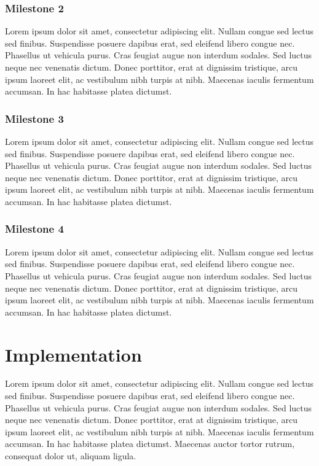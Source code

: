 \documentclass{utitcphd_overleaf}
\begin{document}
\subsection{Milestone 2}

Lorem ipsum dolor sit amet, consectetur adipiscing elit. Nullam congue sed lectus sed finibus. Suspendisse posuere dapibus erat, sed eleifend libero congue nec. Phasellus ut vehicula purus. Cras feugiat augue non interdum sodales. Sed luctus neque nec venenatis dictum. Donec porttitor, erat at dignissim tristique, arcu ipsum laoreet elit, ac vestibulum nibh turpis at nibh. Maecenas iaculis fermentum accumsan. In hac habitasse platea dictumst.

\subsection{Milestone 3}

Lorem ipsum dolor sit amet, consectetur adipiscing elit. Nullam congue sed lectus sed finibus. Suspendisse posuere dapibus erat, sed eleifend libero congue nec. Phasellus ut vehicula purus. Cras feugiat augue non interdum sodales. Sed luctus neque nec venenatis dictum. Donec porttitor, erat at dignissim tristique, arcu ipsum laoreet elit, ac vestibulum nibh turpis at nibh. Maecenas iaculis fermentum accumsan. In hac habitasse platea dictumst.

\subsection{Milestone 4}

Lorem ipsum dolor sit amet, consectetur adipiscing elit. Nullam congue sed lectus sed finibus. Suspendisse posuere dapibus erat, sed eleifend libero congue nec. Phasellus ut vehicula purus. Cras feugiat augue non interdum sodales. Sed luctus neque nec venenatis dictum. Donec porttitor, erat at dignissim tristique, arcu ipsum laoreet elit, ac vestibulum nibh turpis at nibh. Maecenas iaculis fermentum accumsan. In hac habitasse platea dictumst.

\chapter{Implementation}
\label{chap:implementation}

Lorem ipsum dolor sit amet, consectetur adipiscing elit. Nullam congue sed lectus sed finibus. Suspendisse posuere dapibus erat, sed eleifend libero congue nec. Phasellus ut vehicula purus. Cras feugiat augue non interdum sodales. Sed luctus neque nec venenatis dictum. Donec porttitor, erat at dignissim tristique, arcu ipsum laoreet elit, ac vestibulum nibh turpis at nibh. Maecenas iaculis fermentum accumsan. In hac habitasse platea dictumst. Maecenas auctor tortor rutrum, consequat dolor ut, aliquam ligula.
\end{document}
